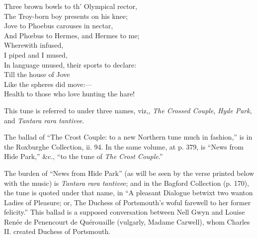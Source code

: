 \begin{dcverse}
\begin{patverse}
Three brown bowls to th’ Olympical rector,\\
The Troy-born boy presents on his knee;\\
Jove to Phoebus carouses in nectar,\\
And Phœbus to Hermes, and Hermes to me;\\
Wherewith infused, \\
I piped and I mused,\\
In language unused, their sports to declare:\\
Till the house of Jove\\
Like the spheres did move:—\\
Health to those who love hunting the hare!
\end{patverse}
\end{dcverse}



This tune is referred to under three names, viz,, \textit{The Crossed Couple}, \textit{Hyde
Park}, and \textit{Tantara rara tantivee}.

The ballad of “The Crost Couple: to a new Northern tune much in fashion,”
is in the Roxburghe Collection, ii. 94. In the same volume, at p. 379, is “News
from Hide Park,” \&c., “to the tune of \textit{The Crost Couple}.”

The burden of “News from Hide Park” (as will be seen by the verse printed
below with the music) is \textit{Tantara rara tantive}e; and in the Bagford Collection
(p. 170), the tune is quoted under that name, in “A pleasant Dialogue betwixt
two wanton Ladies of Pleasure; or, The Duchess of Portsmouth’s woful farewell
to her former felicity.” This ballad is a supposed conversation between Nell
Gwyn and Louise Renée de Penencourt de Quérouaille (vulgarly, Madame
Carwell), whom Charles II. created Duchess of Portsmouth.

